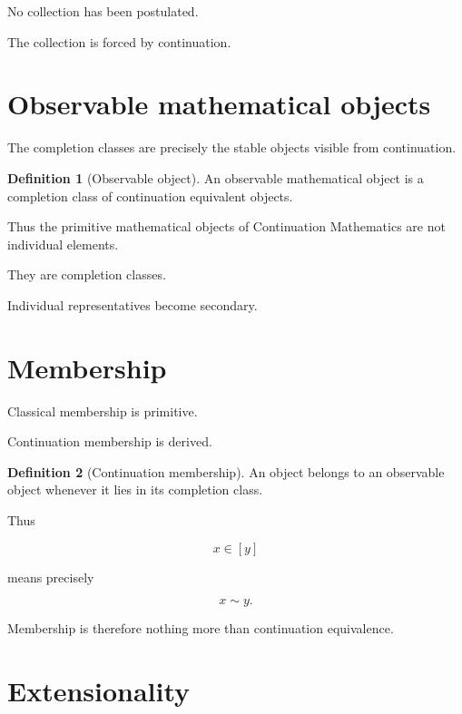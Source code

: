 \documentclass[13pt,openany]{book}
\theoremstyle{plain}
\theoremstyle{definition}
\newtheorem{definition}{Definition}[chapter]
\begin{document}
No collection has been postulated.

The collection is forced by continuation.


\section{Observable mathematical objects}

The completion classes are precisely the stable objects visible from
continuation.

\begin{definition}[Observable object]
An observable mathematical object is a completion class of continuation
equivalent objects.
\end{definition}

Thus the primitive mathematical objects of Continuation Mathematics are not
individual elements.

They are completion classes.

Individual representatives become secondary.


\section{Membership}

Classical membership is primitive.

Continuation membership is derived.

\begin{definition}[Continuation membership]
An object belongs to an observable object whenever it lies in its completion
class.

Thus

\[
x\in [y]
\]

means precisely

\[
x\sim y.
\]
\end{definition}

Membership is therefore nothing more than continuation equivalence.


\section{Extensionality}
\end{document}
